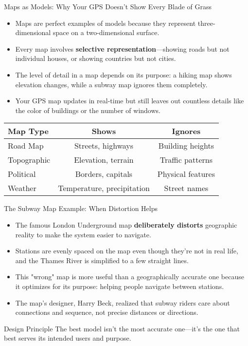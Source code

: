\documentclass{beamer}
\begin{document}
	\begin{frame}{Maps as Models: Why Your GPS Doesn't Show Every Blade of Grass}
		\begin{itemize}
			\item Maps are perfect examples of models because they represent three-dimensional space on a two-dimensional surface.
			\item Every map involves \textbf{selective representation}—showing roads but not individual houses, or showing countries but not cities.
			\item The level of detail in a map depends on its purpose: a hiking map shows elevation changes, while a subway map ignores them completely.
			\item Your GPS map updates in real-time but still leaves out countless details like the color of buildings or the number of windows.
		\end{itemize}
		
		\begin{table}
			\centering
			\begin{tabular}{lcc}
				\toprule
				Map Type & Shows & Ignores \\
				\midrule
				Road Map & Streets, highways & Building heights \\
				Topographic & Elevation, terrain & Traffic patterns \\
				Political & Borders, capitals & Physical features \\
				Weather & Temperature, precipitation & Street names \\
				\bottomrule
			\end{tabular}
		\end{table}
	\end{frame}
	
	\begin{frame}{The Subway Map Example: When Distortion Helps}
		\begin{itemize}
			\item The famous London Underground map \textbf{deliberately distorts} geographic reality to make the system easier to navigate.
			\item Stations are evenly spaced on the map even though they're not in real life, and the Thames River is simplified to a few straight lines.
			\item This "wrong" map is more useful than a geographically accurate one because it optimizes for its purpose: helping people navigate between stations.
			\item The map's designer, Harry Beck, realized that subway riders care about connections and sequence, not precise distances or directions.
		\end{itemize}
		
		\begin{block}{Design Principle}
			The best model isn't the most accurate one—it's the one that best serves its intended users and purpose.
		\end{block}
	\end{frame}
	
\end{document}
